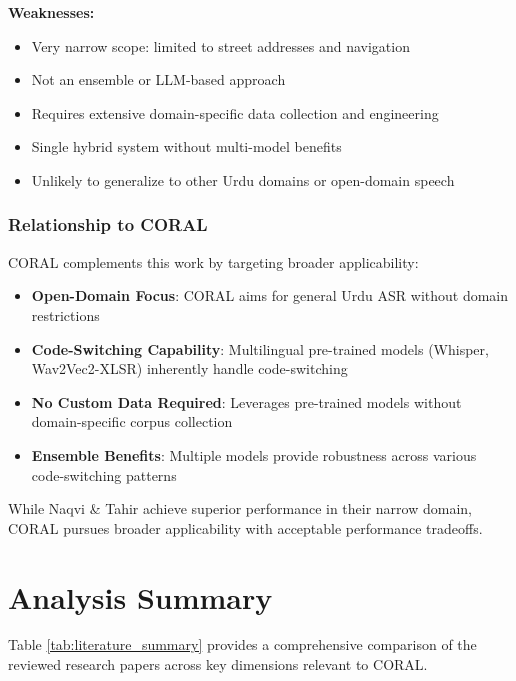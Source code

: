 \textbf{Weaknesses:}
\begin{itemize}
    \item Very narrow scope: limited to street addresses and navigation
    \item Not an ensemble or LLM-based approach
    \item Requires extensive domain-specific data collection and engineering
    \item Single hybrid system without multi-model benefits
    \item Unlikely to generalize to other Urdu domains or open-domain speech
\end{itemize}

\subsubsection{Relationship to CORAL}

CORAL complements this work by targeting broader applicability:

\begin{itemize}
    \item \textbf{Open-Domain Focus}: CORAL aims for general Urdu ASR without domain restrictions
    \item \textbf{Code-Switching Capability}: Multilingual pre-trained models (Whisper, Wav2Vec2-XLSR) inherently handle code-switching
    \item \textbf{No Custom Data Required}: Leverages pre-trained models without domain-specific corpus collection
    \item \textbf{Ensemble Benefits}: Multiple models provide robustness across various code-switching patterns
\end{itemize}

While Naqvi \& Tahir achieve superior performance in their narrow domain, CORAL pursues broader applicability with acceptable performance tradeoffs.

\section{Analysis Summary}

Table \ref{tab:literature_summary} provides a comprehensive comparison of the reviewed research papers across key dimensions relevant to CORAL.

